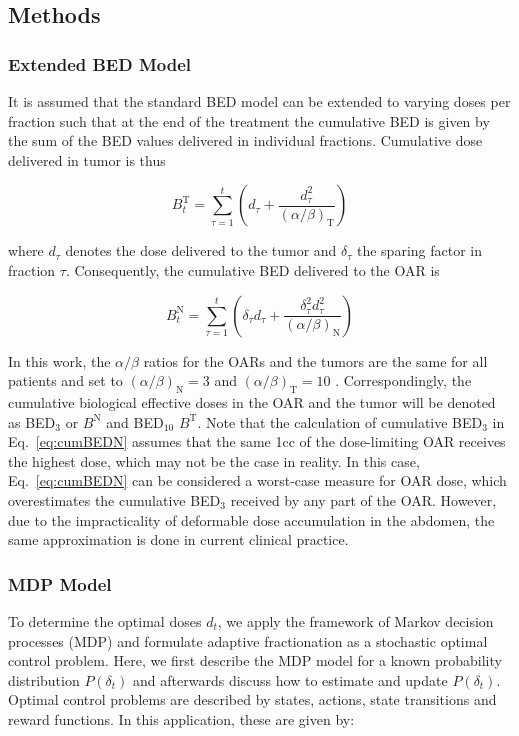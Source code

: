 \documentclass[\relativeRoot/ada.tex]{subfiles}
\begin{document}
\subsection{Methods}
\subsubsection{Extended BED Model}

It is assumed that the standard BED model can be extended to varying doses per fraction such that at the end of the treatment the cumulative BED is given by the sum of the BED values delivered in individual fractions. Cumulative dose delivered in tumor is thus

\begin{equation}\label{eq:cumBEDT}
    B^\text{T}_t = \sum_{\tau=1}^t(d_\tau+\frac{d_\tau^2}{({\alpha}/{\beta})_\text{T}})
\end{equation}

where $d_\tau$ denotes the dose delivered to the tumor and $\delta_\tau$ the sparing factor in fraction $\tau$. Consequently, the cumulative BED delivered to the OAR is

\begin{equation}\label{eq:cumBEDN}
B^\text{N}_t = \sum_{\tau=1}^t(\delta_\tau d_\tau+\frac{\delta_\tau^2 d_\tau^2}{({\alpha}/{\beta})_\text{N}})
\end{equation}

In this work, the ${\alpha}/{\beta}$ ratios for the OARs and the tumors are the same for all patients and set to $({\alpha}/{\beta})_\text{N} = 3$ and $({\alpha}/{\beta})_\text{T} = 10$ \cite{van_leeuwen_alfabeta}. Correspondingly, the cumulative biological effective doses in the OAR and the tumor will be denoted as BED$_3$ or $B^{\text{N}}$ and BED$_{10}$ $B^{\text{T}}$. Note that the calculation of cumulative BED$_3$ in Eq.~\eqref{eq:cumBEDN} assumes that the same 1cc of the dose-limiting OAR receives the highest dose, which may not be the case in reality. In this case, Eq.~\eqref{eq:cumBEDN} can be considered a worst-case measure for OAR dose, which overestimates the cumulative BED$_3$ received by any part of the OAR. However, due to the impracticality of deformable dose accumulation in the abdomen, the same approximation is done in current clinical practice.

\subsubsection{MDP Model}
To determine the  optimal doses $d_t$, we apply the framework of Markov decision processes (MDP) and formulate adaptive fractionation as a stochastic optimal control problem. Here, we first describe the MDP model for a known probability distribution $P(\delta_t)$ and afterwards discuss how to estimate and update $P(\delta_t)$. Optimal control problems are described by states, actions, state transitions and reward functions. In this application, these are given by:
\end{document}
